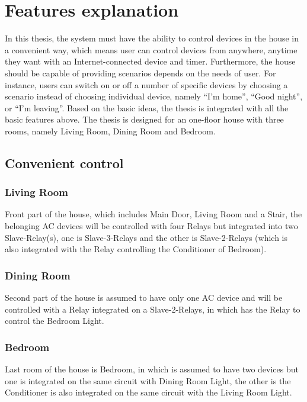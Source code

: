 \section{Features explanation}
    In this thesis, the system must have the ability to control devices in the house in a convenient way, which means user can control devices from anywhere, anytime they want with an Internet-connected device and timer. Furthermore, the house should be capable of providing scenarios depends on the needs of user. For instance, users can switch on or off a number of specific devices by choosing a scenario instead of choosing individual device, namely “I’m home”, “Good night”, or “I’m leaving”. Based on the basic ideas, the thesis is integrated with all the basic features above. The thesis is designed for an one-floor house with three rooms, namely Living Room, Dining Room and Bedroom.
    \subsection{Convenient control}
    \subsubsection{Living Room}
    Front part of the house, which includes Main Door, Living Room and a Stair, the belonging AC devices will be controlled with four Relays but integrated into two Slave-Relay(s), one is Slave-3-Relays and the other is Slave-2-Relays (which is also integrated with the Relay controlling the Conditioner of Bedroom).
    \subsubsection{Dining Room}
    Second part of the house is assumed to have only one AC device and will be controlled with a Relay integrated on a Slave-2-Relays, in which has the Relay to control the Bedroom Light.
    \subsubsection{Bedroom}
    Last room of the house is Bedroom, in which is assumed to have two devices but one is integrated on the same circuit with Dining Room Light, the other is the Conditioner is also integrated on the same circuit with the Living Room Light.

